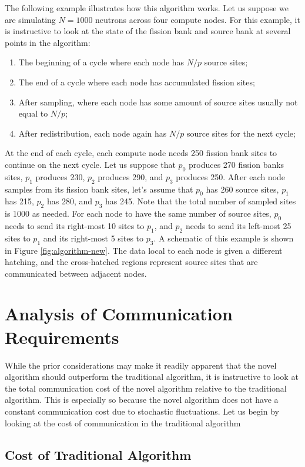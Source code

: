 \documentclass[11pt]{article}
\begin{document}
The following example illustrates how this algorithm works. Let us
suppose we are simulating $N = 1000$ neutrons across four compute
nodes. For this example, it is instructive to look at the state of the
fission bank and source bank at several points in the algorithm:
\begin{enumerate}
\item The beginning of a cycle where each node has $N/p$ source sites;
\item The end of a cycle where each node has accumulated fission sites;
\item After sampling, where each node has some amount of source sites
  usually not equal to $N/p$;
\item After redistribution, each node again has $N/p$ source sites for
  the next cycle;
\end{enumerate}

At the end of each cycle, each compute node needs 250 fission bank
sites to continue on the next cycle. Let us suppose that $p_0$
produces 270 fission banks sites, $p_1$ produces 230, $p_2$ produces
290, and $p_3$ produces 250. After each node samples from its fission
bank sites, let's assume that $p_0$ has 260 source sites, $p_1$ has
215, $p_2$ has 280, and $p_3$ has 245. Note that the total number of
sampled sites is 1000 as needed. For each node to have the same number
of source sites, $p_0$ needs to send its right-most 10 sites to $p_1$,
and $p_2$ needs to send its left-most 25 sites to $p_1$ and its
right-most 5 sites to $p_3$. A schematic of this example is shown in
Figure \ref{fig:algorithm-new}. The data local to each node is given a
different hatching, and the cross-hatched regions represent source
sites that are communicated between adjacent nodes.

\section{Analysis of Communication Requirements}
\label{sec:analysis}

While the prior considerations may make it readily apparent that the
novel algorithm should outperform the traditional algorithm, it is
instructive to look at the total communication cost of the novel
algorithm relative to the traditional algorithm. This is especially so
because the novel algorithm does not have a constant communication
cost due to stochastic fluctuations. Let us begin by looking at the
cost of communication in the traditional algorithm

\subsection{Cost of Traditional Algorithm}
\label{sec:traditional-cost}
\end{document}
